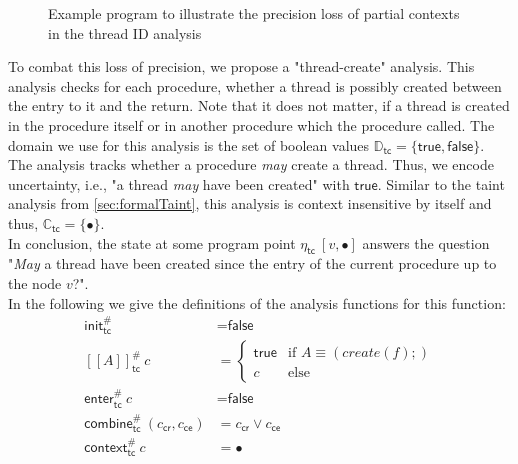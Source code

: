   \begin{figure}
    \centering
    \begin{subfigure}{.35\textwidth}
      \centering
      
    \end{subfigure}
    \caption{Example program to illustrate the precision loss of partial contexts in the thread ID analysis}
    \label{fig:example_thread}
  \end{figure}
  To combat this loss of precision, we propose a "thread-create" analysis. This analysis checks for each procedure, whether a thread is possibly created between the entry to it and the return. Note that it does not matter, if a thread is created in the procedure itself or in another procedure which the procedure called. The domain we use for this analysis is the set of boolean values $\mathbb{D}_\textsf{tc} = \{\textsf{true}, \textsf{false}\}$. The analysis tracks whether a procedure \textit{may} create a thread. Thus, we encode uncertainty, i.e., "a thread \textit{may} have been created" with $\textsf{true}$. Similar to the taint analysis from \autoref{sec:formalTaint}, this analysis is context insensitive by itself and thus, $\mathbb{C}_\textsf{tc} = \{\bullet\}$.\\
  In conclusion, the state at some program point $\eta_\textsf{tc}\ [v,\bullet]$ answers the question "\textit{May} a thread have been created since the entry of the current procedure up to the node $v$?".\\
  In the following we give the definitions of the analysis functions for this function:
  \begin{align*}
    \textsf{init}^{\#}_\textsf{tc} &= \textsf{false}\\
    [\![ A ]\!]^{\#}_\textsf{tc}\ c &= \left\{ \begin{array}{ll}
      \textsf{true} & \text{if }A \equiv (create(f);)\\
      c & \text{else}
    \end{array} \right. \\
    \textsf{enter}^{\#}_\textsf{tc}\ c &= \textsf{false}\\
    \textsf{combine}^{\#}_\textsf{tc}\ (c_\textsf{cr}, c_\textsf{ce}) &= c_\textsf{cr} \lor c_\textsf{ce}\\
    \textsf{context}^{\#}_\textsf{tc}\ c &= \bullet\\
  \end{align*}
  
